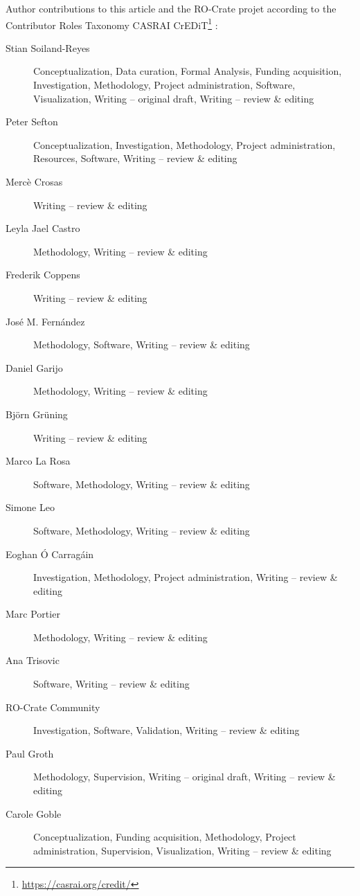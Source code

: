 \documentclass[ds,v1.1.2,openaccess]{iosart2x}%
\begin{document}
Author contributions to this article and the RO-Crate projet according
to the Contributor Roles Taxonomy CASRAI
CrEDiT\footnote{\url{https://casrai.org/credit/}} \cite{doi:10.1087/20150211}:
\begin{description}
\item[Stian Soiland-Reyes]  Conceptualization, Data curation, Formal Analysis, Funding
acquisition, Investigation, Methodology, Project administration,
Software, Visualization, Writing -- original draft, Writing -- review
\& editing

\item[Peter Sefton]  Conceptualization, Investigation, Methodology, Project
administration, Resources, Software, Writing -- review \& editing

\item[Merc\`{e} Crosas]  Writing -- review \& editing

\item[Leyla Jael Castro]  Methodology, Writing -- review \& editing

\item[Frederik Coppens]  Writing -- review \& editing

\item[Jos\'{e} M. Fern\'{a}ndez]  Methodology, Software, Writing -- review \& editing

\item[Daniel Garijo]  Methodology, Writing -- review \& editing

\item[Bj\"{o}rn Gr\"{u}ning]  Writing -- review \& editing

\item[Marco La Rosa]  Software, Methodology, Writing -- review \& editing

\item[Simone Leo]  Software, Methodology, Writing -- review \& editing

\item[Eoghan \'{O} Carrag\'{a}in]  Investigation, Methodology, Project administration, Writing -- review
\& editing

\item[Marc Portier]  Methodology, Writing -- review \& editing

\item[Ana Trisovic]  Software, Writing -- review \& editing

\item[RO-Crate Community]  Investigation, Software, Validation, Writing -- review \& editing

\item[Paul Groth]  Methodology, Supervision, Writing -- original draft, Writing --
review \& editing

\item[Carole Goble]  Conceptualization, Funding acquisition, Methodology, Project
administration, Supervision, Visualization, Writing -- review \& editing
\end{description}
\end{document}
